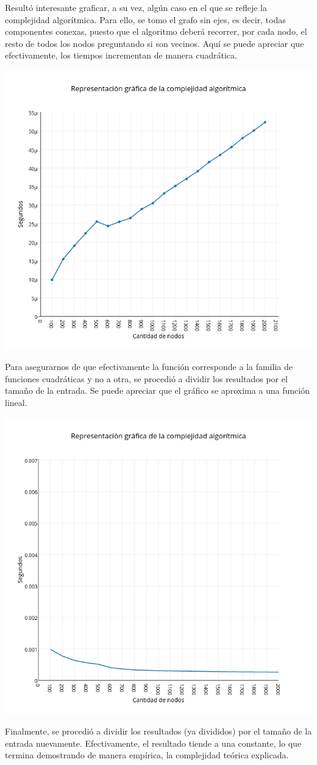 Resultó interesante graficar, a su vez, algún caso en el que se refleje la complejidad algorítmica.
Para ello, se tomo el grafo sin ejes, es decir, todas componentes conexas, puesto que el algoritmo deberá recorrer, por cada nodo, el resto de todos los nodos preguntando si son vecinos.
Aquí se puede apreciar que efectivamente, los tiempos incrementan de manera cuadrática.

\includegraphics[width=15cm,keepaspectratio=yes]{imagenes/greedy/worst2.png}

Para asegurarnos de que efectivamente la función corresponde a la familia de funciones cuadráticas y no a otra, se procedió a dividir los resultados por el tamaño de la entrada.
Se puede apreciar que el gráfico se aproxima a una función lineal.

\includegraphics[width=15cm,keepaspectratio=yes]{imagenes/greedy/worst3.png}

Finalmente, se procedió a dividir los resultados (ya divididos) por el tamaño de la entrada nuevamente.
Efectivamente, el resultado tiende a una constante, lo que termina demostrando de manera empírica, la complejidad teórica explicada.
